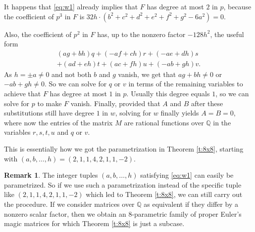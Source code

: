 \documentclass[12pt]{amsart}
\theoremstyle{definition}
\newtheorem{remark}[theorem]{Remark}
\newcommand{\QQ}{\mathbb Q}
\begin{document}
It happens that \eqref{eq:w1} already implies that $F$ has degree at
most $2$ in $p$, because the coefficient of $p^3$ in $F$ is
$32h\cdot(b^2 + c^2 + d^2 + e^2 + f^2 + g^2 - 6a^2)=0$.

Also, the coefficient of $p^2$ in $F$ has, up to the nonzero factor
$-128h^2$, the useful form
\begin{align*}
  \left(a g + b h\right) q + \left(-a f + c h\right) r + \left(-a e +
  d h\right) s\\
  + \left(a d + e h\right) t + \left(a c + f h\right) u + \left(-a b + g h\right) v.
\end{align*}
As $h=\pm a\ne0$ and not both $b$ and $g$ vanish, we get that
$ag+bh\ne0$ or $-ab+gh\ne0$. So we can solve for $q$ or $v$ in terms
of the remaining variables to achieve that $F$ has degree
at most $1$ in $p$. Usually this degree equals $1$, so we can solve
for $p$ to make $F$ vanish. Finally, provided that $A$ and $B$ after these
substitutions still have degree $1$ in $w$, solving for $w$ finally
yields $A=B=0$, where now the entries of the matrix $M$ are rational
functions over $\QQ$ in the variables $r, s, t, u$ and $q$ or $v$.

This is essentially how we got the parametrization in Theorem
\ref{t:8x8}, starting with $(a,b,\dots,h)=(2, 1, 1, 4, 2, 1, 1, -2)$.
\begin{remark}
  The integer tuples $(a, b,\dots, h)$ satisfying \eqref{eq:w1} can
  easily be parametrized. So if we use such a parametrization instead
  of the specific tuple like $(2, 1, 1, 4, 2, 1, 1, -2)$ which led to
  Theorem \ref{t:8x8}, we can still carry out the procedure. If we
  consider matrices over $\QQ$ as equivalent if they differ by a
  nonzero scalar factor, then we obtain an $8$-parametric family of
  proper Euler's magic matrices for which Theorem \ref{t:8x8} is just
  a subcase.
\end{remark}
\end{document}
